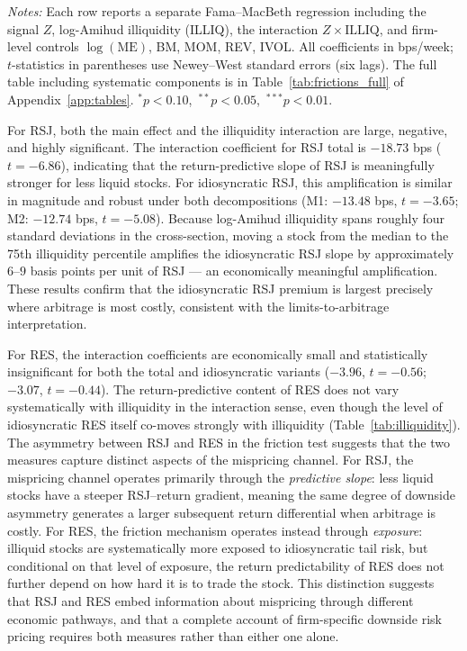 \documentclass[11pt,a4paper]{article}
\begin{document}
\begin{table}[!htbp]
\begin{threeparttable}
\begin{tablenotes}
\footnotesize
\item \textit{Notes:} Each row reports a separate Fama--MacBeth regression including
the signal $Z$, log-Amihud illiquidity (ILLIQ), the interaction $Z \times \text{ILLIQ}$,
and firm-level controls $\log(\text{ME})$, BM, MOM, REV, IVOL. All coefficients in
bps/week; $t$-statistics in parentheses use Newey--West standard errors (six lags).
The full table including systematic components is in Table~\ref{tab:frictions_full}
of Appendix~\ref{app:tables}.
$^{*}p<0.10$,\ $^{**}p<0.05$,\ $^{***}p<0.01$.
\end{tablenotes}
\end{threeparttable}
\end{table}

For RSJ, both the main effect and the illiquidity interaction are large, negative, and
highly significant. The interaction coefficient for RSJ total is $-18.73$ bps
($t=-6.86$), indicating that the return-predictive slope of RSJ is meaningfully stronger
for less liquid stocks. For idiosyncratic RSJ, this amplification is similar in magnitude
and robust under both decompositions (M1: $-13.48$ bps, $t=-3.65$; M2: $-12.74$ bps,
$t=-5.08$). Because log-Amihud illiquidity spans roughly four standard deviations in the
cross-section, moving a stock from the median to the 75th illiquidity percentile amplifies
the idiosyncratic RSJ slope by approximately $6$--$9$ basis points per unit of RSJ ---
an economically meaningful amplification. These results confirm that the idiosyncratic RSJ
premium is largest precisely where arbitrage is most costly, consistent with the
limits-to-arbitrage interpretation.

For RES, the interaction coefficients are economically small and statistically
insignificant for both the total and idiosyncratic variants ($-3.96$, $t=-0.56$; $-3.07$,
$t=-0.44$). The return-predictive content of RES does not vary systematically with
illiquidity in the interaction sense, even though the level of idiosyncratic RES itself
co-moves strongly with illiquidity (Table~\ref{tab:illiquidity}). The asymmetry between
RSJ and RES in the friction test suggests that the two measures capture distinct aspects
of the mispricing channel. For RSJ, the mispricing channel operates primarily through
the \textit{predictive slope}: less liquid stocks have a steeper RSJ--return gradient,
meaning the same degree of downside asymmetry generates a larger subsequent return
differential when arbitrage is costly. For RES, the friction mechanism operates instead
through \textit{exposure}: illiquid stocks are systematically more exposed to
idiosyncratic tail risk, but conditional on that level of exposure, the return
predictability of RES does not further depend on how hard it is to trade the stock.
This distinction suggests that RSJ and RES embed information about mispricing through
different economic pathways, and that a complete account of firm-specific downside risk
pricing requires both measures rather than either one alone.
\end{document}
